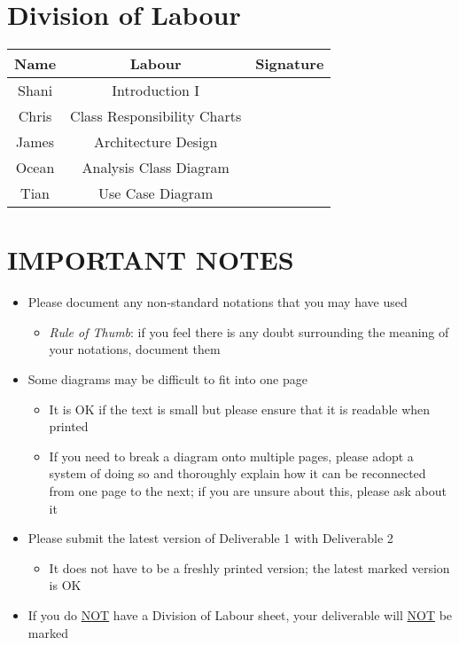 \documentclass[]{article}
\begin{document}
\appendix
\section{Division of Labour}
\label{sec:division_of_labour}
\begin{center}
\begin{tabular}{ |c|c|c| } 
 \hline
 Name & Labour & Signature              \\ \hline
 Shani & Introduction I & \\ 
 Chris & Class Responsibility Charts &  \\
 James & Architecture Design &  \\ 
 Ocean & Analysis Class Diagram &  \\ 
 Tian & Use Case Diagram & \\ 
 \hline
\end{tabular}
\end{center}

\newpage
\section*{IMPORTANT NOTES}
\begin{itemize}
	\item Please document any non-standard notations that you may have used
	\begin{itemize}
		\item \emph{Rule of Thumb}: if you feel there is any doubt surrounding the meaning of your notations, document them
	\end{itemize}
	\item Some diagrams may be difficult to fit into one page
	\begin{itemize}
		\item It is OK if the text is small but please ensure that it is readable when printed
		\item If you need to break a diagram onto multiple pages, please adopt a system of doing so and thoroughly explain how it can be reconnected from one page to the next; if you are unsure about this, please ask about it
	\end{itemize}
	\item Please submit the latest version of Deliverable 1 with Deliverable 2
	\begin{itemize}
		\item It does not have to be a freshly printed version; the latest marked version is OK
	\end{itemize}
	\item If you do \underline{NOT} have a Division of Labour sheet, your deliverable will \underline{NOT} be marked
\end{itemize}
\end{document}
